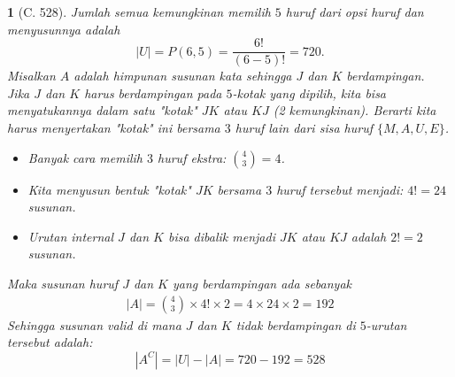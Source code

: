 \documentclass[11pt,a4paper,DIV=12]{scrartcl}
\theoremstyle{problemstyle}
\theoremstyle{answerstyle}
\newtheorem{answer}{}
\begin{document}
\begin{answer}[C. 528]
  Jumlah semua kemungkinan memilih $5$ huruf dari opsi huruf dan menyusunnya adalah
  \[ |U| = P(6,5) = \frac{6!}{(6-5)!} = 720. \]
  Misalkan $A$ adalah himpunan susunan kata sehingga $J$ dan $K$ berdampingan.\\
  Jika $J$ dan $K$ harus berdampingan pada $5$-kotak yang dipilih, kita bisa menyatukannya dalam satu "kotak" $\boxed{JK}$ atau $\boxed{KJ}$ (2 kemungkinan).
  Berarti kita harus menyertakan "kotak" ini bersama $3$ huruf lain dari sisa huruf $\{M, A, U, E\}$.
  \begin{itemize}
    \item Banyak cara memilih $3$ huruf ekstra: $\binom{4}{3} = 4$.
    \item Kita menyusun bentuk "kotak" $\boxed{JK}$ bersama $3$ huruf tersebut menjadi: $4! = 24$ susunan.
    \item Urutan internal $J$ dan $K$ bisa dibalik menjadi $\boxed{JK}$ atau $\boxed{KJ}$ adalah $2! = 2$ susunan.
  \end{itemize}
  Maka susunan huruf $J$ dan $K$ yang berdampingan ada sebanyak
  \begin{align*}
    |A|=\binom{4}{3} \times 4! \times 2 = 4 \times 24 \times 2 = 192
  \end{align*}
  Sehingga susunan valid di mana $J$ dan $K$ tidak berdampingan di $5$-urutan tersebut adalah:
  \[ |A^C| = |U| - |A| = 720 - 192 = \boxed{528} \]
\end{answer}
\end{document}
